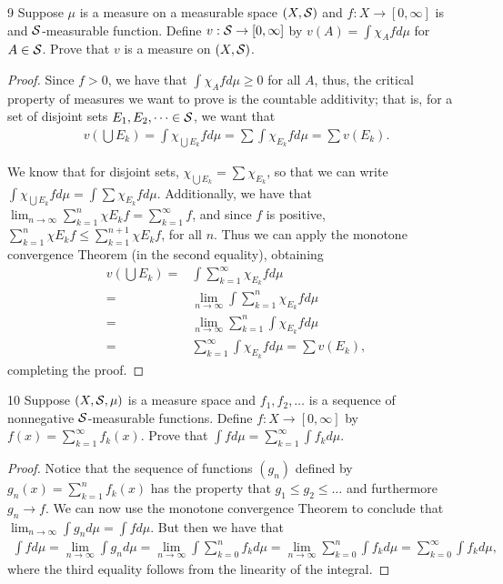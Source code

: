 \begin{exercise}{9}
Suppose $\mu$ is a measure on a measurable space $(X, \mathcal{S})$ and $f: X \to [0,\infty]$ is and $\mathcal{S}$-measurable function.
Define $v: \mathcal{S} \to [0, \infty]$ by $v(A) = \int \chi_A f d\mu$ for $A \in \mathcal{S}$.
Prove that $v$ is a measure on $(X, \mathcal{S})$.
\end{exercise}
\begin{proof}
Since $f > 0$, we have that $\int \chi_A f d\mu \geq 0$ for all $A$, thus, the critical property of measures we want to prove is the countable additivity;
that is, for a set of disjoint sets $E_1, E_2, \dots \in \mathcal{S}$, we want that 
\begin{align*}
    v(\bigcup E_k) 
    = \int \chi_{\bigcup E_k} f d\mu 
    = \sum \int \chi_{E_k} f d\mu 
    = \sum v(E_k).
\end{align*}

We know that for disjoint sets, $\chi_{\bigcup E_k} = \sum \chi_{E_k}$, so that we can write $\int \chi_{\bigcup E_k} f d\mu = \int \sum \chi_{E_k} f d\mu$.
Additionally, we have that $\lim_{n\to \infty} \sum_{k=1}^n \chi{E_k}f = \sum_{k = 1}^\infty f$, and since $f$ is positive, $\sum_{k=1}^n \chi{E_k}f \leq \sum_{k=1}^{n+1} \chi{E_k}f$, for all $n$.
Thus we can apply the monotone convergence Theorem (in the second equality), obtaining
\begin{align*}
    v(\bigcup E_k)
    =& \int \sum_{k=1}^\infty \chi_{E_k}f d\mu\\
    =& \lim_{n \to \infty} \int \sum_{k = 1}^n \chi_{E_k} f d\mu\\
    =& \lim_{n \to \infty} \sum_{k = 1}^n \int \chi_{E_k}f d\mu\\
    =& \sum_{k = 1}^\infty \int \chi_{E_k}f d\mu
    = \sum v(E_k),
\end{align*}
completing the proof.
\end{proof} 

\begin{exercise}{10}
Suppose $(X, \mathcal{S}, \mu)$ is a measure space and $f_1, f_2, \dots$ is a sequence of nonnegative $\mathcal{S}$-measurable functions.
Define $f: X \to [0, \infty]$ by $f(x) = \sum_{k=1}^\infty f_k(x)$.
Prove that $\int f d\mu = \sum_{k=1}^\infty \int f_k d\mu$.
\end{exercise}
\begin{proof}
Notice that the sequence of functions $(g_n)$ defined by $g_n(x) = \sum_{k=1}^n f_k(x)$ has the property that $g_1 \leq g_2 \leq \dots$ and furthermore $g_n \to f$.
We can now use the monotone convergence Theorem to conclude that $\lim_{n \to \infty} \int g_n d\mu = \int f d\mu$.
But then we have that
\begin{align*}
    \int f d\mu
    = \lim_{n \to \infty} \int g_n d\mu
    = \lim_{n \to \infty} \int \sum_{k=0}^n f_k d\mu
    = \lim_{n \to \infty} \sum_{k=0}^n \int f_k d\mu
    = \sum_{k=0}^\infty \int f_k d\mu, 
\end{align*}
where the third equality follows from the linearity of the integral.
\end{proof} 

